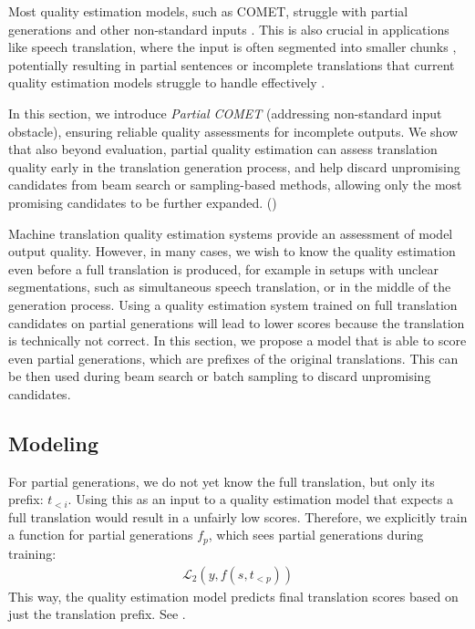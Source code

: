 Most quality estimation models, such as COMET, struggle with partial generations and other non-standard inputs \citep{zouhar-etal-2024-pitfalls}.
This is also crucial in applications like speech translation, where the input is often segmented into smaller chunks \citep{sperber-etal-2024-evaluating}, potentially resulting in partial sentences or incomplete translations that current quality estimation models struggle to handle effectively \citep[][Appendix D1]{amrhein-haddow-2022-dont}.

In this section, we introduce \textit{Partial COMET} (addressing non-standard input obstacle), ensuring reliable quality assessments for incomplete outputs. We show that also beyond evaluation, partial quality estimation can assess translation quality early in the translation generation process, and help discard unpromising candidates from beam search or sampling-based methods, allowing only the most promising candidates to be further expanded.
()



Machine translation quality estimation systems provide an assessment of model output quality.
However, in many cases, we wish to know the quality estimation even before a full translation is produced, for example in setups with unclear segmentations, such as simultaneous speech translation, or in the middle of the generation process.
Using a quality estimation system trained on full translation candidates on partial generations will lead to lower scores because the translation is technically not correct.
In this section, we propose a model that is able to score even partial generations, which are prefixes of the original translations.
This can be then used during beam search or batch sampling to discard unpromising candidates.





\subsection{Modeling}

For partial generations, we do not yet know the full translation, but only its prefix: $t_{<i}$.
Using this as an input to a quality estimation model that expects a full translation would result in a unfairly low scores.
Therefore, we explicitly train a function for partial generations $f_p$, which sees partial generations during training:
\begin{align}
\mathcal{L}_2(y, f(s, t_{<p}))
\end{align}
This way, the quality estimation model predicts final translation scores based on just the translation prefix.
See .

